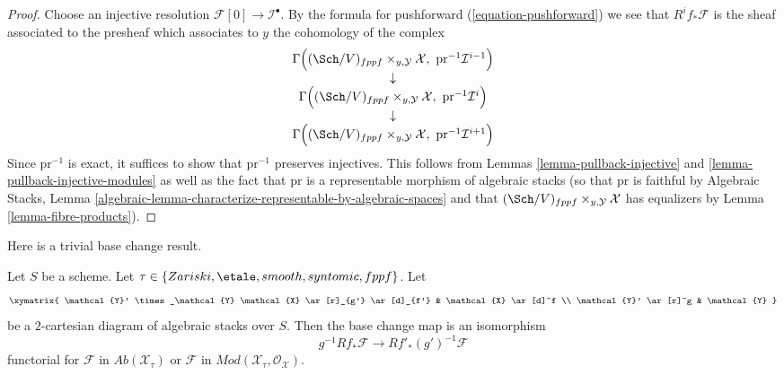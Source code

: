 \begin{proof}
Choose an injective resolution $\mathcal{F}[0] \to \mathcal{I}^\bullet$.
By the formula for pushforward (\ref{equation-pushforward}) we see that
$R^if_*\mathcal{F}$ is the sheaf associated to the presheaf which associates
to $y$ the cohomology of the complex
$$
\begin{matrix}
\Gamma\Big((\Sch/V)_{fppf} \times_{y, \mathcal{Y}} \mathcal{X},
\ \text{pr}^{-1}\mathcal{I}^{i - 1}\Big) \\
\downarrow \\
\Gamma\Big((\Sch/V)_{fppf} \times_{y, \mathcal{Y}} \mathcal{X},
\ \text{pr}^{-1}\mathcal{I}^i\Big) \\
\downarrow \\
\Gamma\Big((\Sch/V)_{fppf} \times_{y, \mathcal{Y}} \mathcal{X},
\ \text{pr}^{-1}\mathcal{I}^{i + 1}\Big)
\end{matrix}
$$
Since $\text{pr}^{-1}$ is exact, it suffices to show that
$\text{pr}^{-1}$ preserves injectives. This follows from
Lemmas \ref{lemma-pullback-injective} and
\ref{lemma-pullback-injective-modules}
as well as the fact that $\text{pr}$ is a representable morphism of
algebraic stacks (so that $\text{pr}$ is faithful by
Algebraic Stacks, Lemma
\ref{algebraic-lemma-characterize-representable-by-algebraic-spaces}
and that
$(\Sch/V)_{fppf} \times_{y, \mathcal{Y}} \mathcal{X}$
has equalizers by 
Lemma \ref{lemma-fibre-products}).
\end{proof}

\noindent
Here is a trivial base change result.

\begin{lemma}
\label{lemma-base-change-higher-direct-images}
Let $S$ be a scheme. Let
$\tau \in \{Zariski,\linebreak[0] \etale,\linebreak[0]
smooth,\linebreak[0] syntomic,\linebreak[0] fppf\}$. Let
$$
\xymatrix{
\mathcal{Y}' \times_\mathcal{Y} \mathcal{X} \ar[r]_{g'} \ar[d]_{f'} &
\mathcal{X} \ar[d]^f \\
\mathcal{Y}' \ar[r]^g & \mathcal{Y}
}
$$
be a $2$-cartesian diagram of algebraic stacks over $S$. Then the base change
map is an isomorphism
$$
g^{-1}Rf_*\mathcal{F} \longrightarrow Rf'_*(g')^{-1}\mathcal{F}
$$
functorial for $\mathcal{F}$ in $\textit{Ab}(\mathcal{X}_\tau)$
or $\mathcal{F}$ in $\textit{Mod}(\mathcal{X}_\tau, \mathcal{O}_\mathcal{X})$.
\end{lemma}

